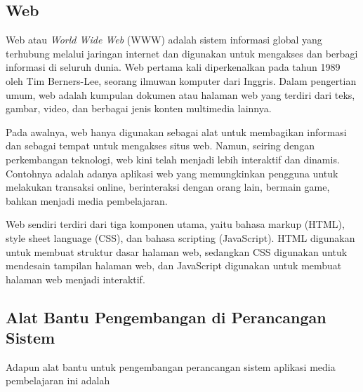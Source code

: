 \subsection{Web}
Web atau \textit{World Wide Web} (WWW) adalah sistem informasi global yang terhubung melalui jaringan internet dan digunakan untuk mengakses dan berbagi informasi di seluruh dunia. Web pertama kali diperkenalkan pada tahun 1989 oleh Tim Berners-Lee, seorang ilmuwan komputer dari Inggris. Dalam pengertian umum, web adalah kumpulan dokumen atau halaman web yang terdiri dari teks, gambar, video, dan berbagai jenis konten multimedia lainnya.

Pada awalnya, web hanya digunakan sebagai alat untuk membagikan informasi dan sebagai tempat untuk mengakses situs web. Namun, seiring dengan perkembangan teknologi, web kini telah menjadi lebih interaktif dan dinamis. Contohnya adalah adanya aplikasi web yang memungkinkan pengguna untuk melakukan transaksi online, berinteraksi dengan orang lain, bermain game, bahkan menjadi media pembelajaran.

Web sendiri terdiri dari tiga komponen utama, yaitu bahasa markup (HTML), style sheet language (CSS), dan bahasa scripting (JavaScript). HTML digunakan untuk membuat struktur dasar halaman web, sedangkan CSS digunakan untuk mendesain tampilan halaman web, dan JavaScript digunakan untuk membuat halaman web menjadi interaktif.

\subsection{Alat Bantu Pengembangan di Perancangan Sistem}

Adapun alat bantu untuk pengembangan perancangan sistem aplikasi media pembelajaran ini adalah


